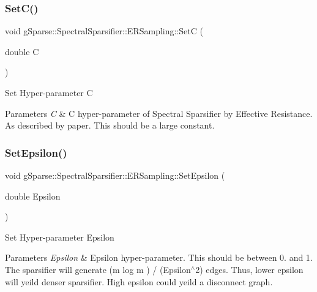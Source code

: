 \subsubsection{\texorpdfstring{Set\+C()}{SetC()}}
{\footnotesize\ttfamily void g\+Sparse\+::\+Spectral\+Sparsifier\+::\+E\+R\+Sampling\+::\+SetC (\begin{DoxyParamCaption}\item[{double}]{C }\end{DoxyParamCaption})\hspace{0.3cm}{\ttfamily [inline]}}

Set Hyper-\/parameter C 
\begin{DoxyParams}{Parameters}
{\em C} & C hyper-\/parameter of Spectral Sparsifier by Effective Resistance. As described by paper. This should be a large constant. \\
\hline
\end{DoxyParams}
\mbox{\label{classg_sparse_1_1_spectral_sparsifier_1_1_e_r_sampling_a57eceac9af3b8846c3370eca999a9a57}} 
\subsubsection{\texorpdfstring{Set\+Epsilon()}{SetEpsilon()}}
{\footnotesize\ttfamily void g\+Sparse\+::\+Spectral\+Sparsifier\+::\+E\+R\+Sampling\+::\+Set\+Epsilon (\begin{DoxyParamCaption}\item[{double}]{Epsilon }\end{DoxyParamCaption})\hspace{0.3cm}{\ttfamily [inline]}}

Set Hyper-\/parameter Epsilon 
\begin{DoxyParams}{Parameters}
{\em Epsilon} & Epsilon hyper-\/parameter. This should be between 0. and 1. The sparsifier will generate (m log m ) / (Epsilon$^\wedge$2) edges. Thus, lower epsilon will yeild denser sparsifier. High epsilon could yeild a disconnect graph. \\
\hline
\end{DoxyParams}
\mbox{\label{classg_sparse_1_1_spectral_sparsifier_1_1_e_r_sampling_a35cf40021c7fa90b5dda042896691bff}} 
